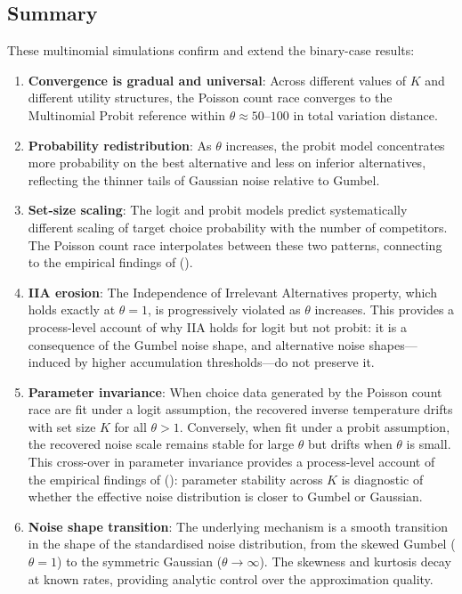 \documentclass[
  man,
  floatsintext,
  longtable,
  a4paper,
  nolmodern,
  notxfonts,
  notimes,
  colorlinks=true,linkcolor=blue,citecolor=blue,urlcolor=blue]{apa7}
\begin{document}
\subsection{Summary}\label{summary}

These multinomial simulations confirm and extend the binary-case
results:

\begin{enumerate}
\def\labelenumi{\arabic{enumi}.}
\item
  \textbf{Convergence is gradual and universal}: Across different values
  of \(K\) and different utility structures, the Poisson count race
  converges to the Multinomial Probit reference within
  \(\theta \approx 50\)--\(100\) in total variation distance.
\item
  \textbf{Probability redistribution}: As \(\theta\) increases, the
  probit model concentrates more probability on the best alternative and
  less on inferior alternatives, reflecting the thinner tails of
  Gaussian noise relative to Gumbel.
\item
  \textbf{Set-size scaling}: The logit and probit models predict
  systematically different scaling of target choice probability with the
  number of competitors. The Poisson count race interpolates between
  these two patterns, connecting to the empirical findings of
  ().
\item
  \textbf{IIA erosion}: The Independence of Irrelevant Alternatives
  property, which holds exactly at \(\theta = 1\), is progressively
  violated as \(\theta\) increases. This provides a process-level
  account of why IIA holds for logit but not probit: it is a consequence
  of the Gumbel noise shape, and alternative noise shapes---induced by
  higher accumulation thresholds---do not preserve it.
\item
  \textbf{Parameter invariance}: When choice data generated by the
  Poisson count race are fit under a logit assumption, the recovered
  inverse temperature drifts with set size \(K\) for all \(\theta > 1\).
  Conversely, when fit under a probit assumption, the recovered noise
  scale remains stable for large \(\theta\) but drifts when \(\theta\)
  is small. This cross-over in parameter invariance provides a
  process-level account of the empirical findings of
  ():
  parameter stability across \(K\) is diagnostic of whether the
  effective noise distribution is closer to Gumbel or Gaussian.
\item
  \textbf{Noise shape transition}: The underlying mechanism is a smooth
  transition in the shape of the standardised noise distribution, from
  the skewed Gumbel (\(\theta = 1\)) to the symmetric Gaussian
  (\(\theta \to \infty\)). The skewness and kurtosis decay at known
  rates, providing analytic control over the approximation quality.
\end{enumerate}
\end{document}
